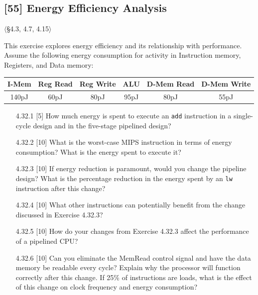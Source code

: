 \problembreak

\subsection{[55] Energy Efficiency Analysis}
\hypertarget{prob-4.32}{}
\noindent$\langle$\S4.3, 4.7, 4.15$\rangle$\medskip

\noindent This exercise explores energy efficiency and its relationship with
performance. Assume the following energy consumption for activity in
Instruction memory, Registers, and Data memory:

\begin{center}
\begin{tabular}{cccccc}
\toprule
\textbf{I-Mem} & \textbf{Reg Read} & \textbf{Reg Write} & \textbf{ALU} &
\textbf{D-Mem Read} & \textbf{D-Mem Write} \\
\midrule
140pJ & 60pJ & 80pJ & 95pJ & 80pJ & 55pJ \\
\bottomrule
\end{tabular}
\end{center}

\begin{enumerate}
  \item[4.32.1] [5] How much energy is spent to execute an \texttt{add}
        instruction in a single-cycle design and in the five-stage pipelined
        design?
  \item[4.32.2] [10] What is the worst-case MIPS instruction in terms of
        energy consumption? What is the energy spent to execute it?
  \item[4.32.3] [10] If energy reduction is paramount, would you change the
        pipeline design? What is the percentage reduction in the energy spent
        by an \texttt{lw} instruction after this change?
  \item[4.32.4] [10] What other instructions can potentially benefit from
        the change discussed in Exercise 4.32.3?
  \item[4.32.5] [10] How do your changes from Exercise 4.32.3 affect the
        performance of a pipelined CPU?
  \item[4.32.6] [10] Can you eliminate the MemRead control signal and have
        the data memory be readable every cycle? Explain why the processor
        will function correctly after this change. If 25\% of instructions
        are loads, what is the effect of this change on clock frequency and
        energy consumption?
\end{enumerate}

